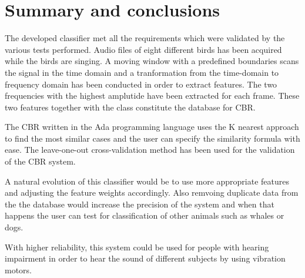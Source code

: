 \section{Summary and conclusions}
The developed classifier met all the requirements which were validated
by the various tests performed. Audio files of eight different birds has been
acquired while the birds are singing. A moving window
with a predefined boundaries scans the signal in the time domain and a tranformation
from the time-domain to frequency domain has been conducted in order to extract features.
The two frequencies with the highest amplutide have been extracted for each frame.
These two features together with the class constitute the database for CBR.

The CBR written in the Ada programming language uses the K nearest approach to
find the most similar cases and the user can specify the similarity formula with ease.
The leave-one-out cross-validation method has been used for the validation of the CBR system.

A natural evolution of this classifier would be to use more appropriate features
and adjusting the feature weights accordingly. Also remvoing duplicate data from
the the database would increase the precision of the system and when that happens
the user can test for classification of other animals such as whales or dogs.

With higher reliability, this system could be used for people with hearing impairment
in order to hear the sound of different subjects by using vibration motors. 
